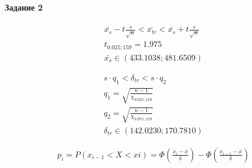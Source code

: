 \paragraph{Задание 2}

\begin{gather*}
    \bar{x_{s}} - t\frac{s}{\sqrt{n}} < \bar{x_{tr}} < \bar{x_{s}} + t\frac{s}{\sqrt{n}}\\
    t_{0.025;159} = 1.975\\
    \bar{x_{s}} \in (433.1038; 481.6509)
\end{gather*}

\begin{gather*}
    s \cdot q_{1} < \delta_{tr} < s \cdot q_{2}\\
    q_{1} = \sqrt{\frac{n - 1}{\chi_{0.025;159}}}\\
    q_{2} = \sqrt{\frac{n - 1}{\chi_{0.975;159}}}\\
    \delta_{tr} \in (142.0230; 170.7810)
\end{gather*}

\begin{gather*}
    p_{i} = P(x_{i-1} < X < x{i}) = \Phi(\frac{x_{i} - \bar{x}}{\delta}) - \Phi(\frac{x_{i - 1} - \bar{x}}{\delta})
\end{gather*}

